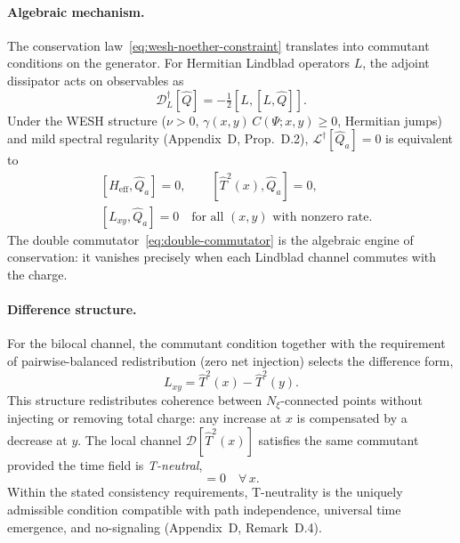 \documentclass[12pt,a4paper]{article}
\numberwithin{equation}{section}
\begin{document}
\paragraph{Algebraic mechanism.}
The conservation law~\eqref{eq:wesh-noether-constraint} translates into 
commutant conditions on the generator. For Hermitian Lindblad operators 
$L$, the adjoint dissipator acts on observables as
\begin{equation}
\mathcal{D}^\dagger_L[\hat{Q}] = -\tfrac{1}{2}[L,[L,\hat{Q}]].
\label{eq:double-commutator}
\end{equation}
Under the WESH structure ($\nu>0$, $\gamma(x,y)\,C(\Psi;x,y)\ge 0$, Hermitian 
jumps) and mild spectral regularity (Appendix~D, Prop.~D.2), 
$\mathcal{L}^\dagger[\hat{Q}_a] = 0$ is equivalent to
\begin{equation}
\begin{split}
&[H_{\mathrm{eff}}, \hat{Q}_a] = 0, \qquad 
[\hat{T}^2(x), \hat{Q}_a] = 0, \\
&[L_{xy}, \hat{Q}_a] = 0 \quad \text{for all $(x,y)$ with nonzero rate}.
\end{split}
\label{eq:commutant-conditions}
\end{equation}
The double commutator~\eqref{eq:double-commutator} is the algebraic engine 
of conservation: it vanishes precisely when each Lindblad channel commutes 
with the charge.

\paragraph{Difference structure.}
For the bilocal channel, the commutant condition together with the requirement 
of pairwise-balanced redistribution (zero net injection) selects the difference form,
\begin{equation}
L_{xy} = \hat{T}^2(x) - \hat{T}^2(y).
\label{eq:difference_Lxy}
\end{equation}
This structure redistributes coherence between $N_\xi$-connected points 
without injecting or removing total charge: any increase at $x$ is 
compensated by a decrease at $y$. The local channel 
$\mathcal{D}[\hat{T}^2(x)]$ satisfies the same commutant provided the 
time field is \emph{T-neutral},
\begin{equation}
[\hat{T}(x), \hat{Q}_{\mathrm{tot}}] = 0 \quad \forall\, x.
\label{eq:T-neutrality}
\end{equation}
Within the stated consistency requirements, T-neutrality is the 
uniquely admissible condition compatible with path independence, 
universal time emergence, and no-signaling (Appendix~D, Remark~D.4).
\end{document}
